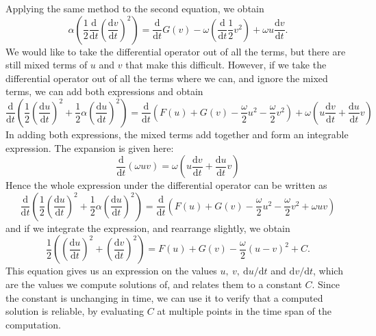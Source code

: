 \documentclass{article}
\begin{document}
Applying the same method to the second equation, we obtain
\begin{equation*}
    \alpha\left(
        \frac{1}{2}\frac{\mathrm{d}}{\mathrm{d}t}\left(\frac{\mathrm{d}v}{\mathrm{d}t}\right) ^2
    \right) = \frac{\mathrm{d}}{\mathrm{d}t}G(v) - \omega\left( \frac{\mathrm{d}}{\mathrm{d}t}\frac{1}{2}v^2 \right) + \omega u \frac{\mathrm{d}v}{\mathrm{d}t}.
\end{equation*}
We would like to take the differential operator out of all the terms, but there are still mixed terms of $u$ and $v$ that make this difficult.
However, if we take the differential operator out of all the terms where we can, and ignore the mixed terms, we can add both expressions and obtain
\begin{equation*}
    \frac{\mathrm{d}}{\mathrm{d}t}\left(
        \frac{1}{2}\left(\frac{\mathrm{d}u}{\mathrm{d}t}\right)^2 + \frac{1}{2}\alpha\left(\frac{\mathrm{d}u}{\mathrm{d}t}\right)^2
    \right) = \frac{\mathrm{d}}{\mathrm{d}t}\left(
        F(u) + G(v) - \frac{\omega}{2}u^2 -\frac{\omega}{2}v^2
    \right) + \omega \left(
        u \frac{\mathrm{d}v}{\mathrm{d}t} + \frac{\mathrm{d}u}{\mathrm{d}t}v
    \right)
\end{equation*}
In adding both expressions, the mixed terms add together and form an integrable expression.
The expansion is given here:
\begin{equation*}
    \frac{\mathrm{d}}{\mathrm{d}t}(\omega uv) = \omega \left( u \frac{\mathrm{d}v}{\mathrm{d}t} + \frac{\mathrm{d}u}{\mathrm{d}t} v \right)
\end{equation*}
Hence the whole expression under the differential operator can be written as
\begin{equation*}
    \frac{\mathrm{d}}{\mathrm{d}t}\left(
        \frac{1}{2}\left(\frac{\mathrm{d}u}{\mathrm{d}t}\right)^2 + \frac{1}{2}\alpha\left(\frac{\mathrm{d}u}{\mathrm{d}t}\right)^2
    \right) = \frac{\mathrm{d}}{\mathrm{d}t}\left(
        F(u) + G(v) - \frac{\omega}{2}u^2 -\frac{\omega}{2}v^2 + \omega uv
    \right) 
\end{equation*}
and if we integrate the expression, and rearrange slightly, we obtain
\begin{equation}
    \frac{1}{2}\left(
        \left(\frac{\mathrm{d}u}{\mathrm{d}t}\right)^2 + \left(\frac{\mathrm{d}v}{\mathrm{d}t}\right)^2
    \right) = F(u) + G(v) - \frac{\omega}{2}(u-v)^2 + C.
    \label{eqn:twomass_energy_constant}
\end{equation}
This equation gives us an expression on the values \(u,~v,~\mathrm{d}u/\mathrm{d}t\) and \(\mathrm{d}v/\mathrm{d}t\),
which are the values we compute solutions of, and relates them to a constant $C$.
Since the constant is unchanging in time, we can use it to verify that a computed solution is reliable,
by evaluating $C$ at multiple points in the time span of the computation.

\end{document}
